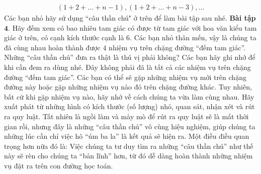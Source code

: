 \begin{align*}
	(1 \!+\! 2 \!+\! \ldots \!+\! n\!-\!1), (1 \!+\! 2 \!+\! \ldots \!+\! n\!-\!3),\ldots
\end{align*}
Các bạn nhỏ hãy sử dụng ``câu thần chú" ở trên để làm bài tập sau nhé. 
\vskip 0.1cm
{\bf\color{toancuabi} Bài tập $\pmb{4.}$} Hãy đếm xem có bao nhiêu tam giác có được từ tam giác với hoa văn kiểu tam giác ở trên, có cạnh kích thước cạnh là $6$.
\vskip 0.1cm
Các bạn nhỏ thân mến, vậy là chúng ta đã cùng nhau hoàn thành được $4$ nhiệm vụ trên chặng đường “đếm tam giác”. Những “câu thần chú” đưa ra thật là thú vị phải không? Các bạn hãy ghi nhớ để khi cần đem ra dùng nhé. Đây không phải đã là tất cả các nhiệm vụ trên chặng đường “đếm tam giác”. Các bạn có thể sẽ gặp những nhiệm vụ mới trên chặng đường này hoặc gặp những nhiệm vụ nào đó trên chặng đường khác. Tuy nhiên, bất cứ khi gặp nhiệm vụ nào, hãy nhớ về cách chúng ta vừa làm cùng nhau. Hãy xuất phát từ những hình có kích thước (số lượng) nhỏ, quan sát, nhận xét và rút ra quy luật. Tất nhiên là ngồi làm và mày mò để rút ra quy luật sẽ là mất thời gian rồi, nhưng đây là những “câu thần chú” vô cùng hiệu nghiệm, giúp chúng ta những lúc cần chỉ việc hô “úm ba la” là kết quả sẽ hiện ra. Một điều điều quan trọng hơn nữa đó là: Việc chúng ta tư duy tìm ra những “câu thần chú” như thế này sẽ rèn cho chúng ta “bản lĩnh” hơn, từ đó dễ dàng hoàn thành những nhiệm vụ đặt ra trên con đường học toán.